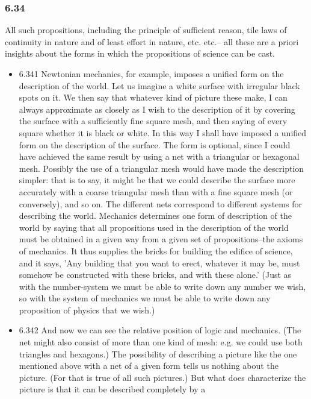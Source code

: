 \documentclass[11pt]{article}
\begin{document}
\subsubsection*{6.34}
\label{sec:org5f01576}
All such propositions, including the principle of sufficient reason,
tile laws of continuity in nature and of least effort in nature, etc. etc.--
all these are a priori insights about the forms in which the propositions
of science can be cast.
\begin{itemize}
\item 6.341
\label{sec:org4d0af76}
Newtonian mechanics, for example, imposes a unified form on the
description of the world. Let us imagine a white surface with irregular
black spots on it. We then say that whatever kind of picture these make, I
can always approximate as closely as I wish to the description of it by
covering the surface with a sufficiently fine square mesh, and then saying
of every square whether it is black or white. In this way I shall have
imposed a unified form on the description of the surface. The form is
optional, since I could have achieved the same result by using a net with a
triangular or hexagonal mesh. Possibly the use of a triangular mesh would
have made the description simpler: that is to say, it might be that we
could describe the surface more accurately with a coarse triangular mesh
than with a fine square mesh (or conversely), and so on. The different nets
correspond to different systems for describing the world. Mechanics
determines one form of description of the world by saying that all
propositions used in the description of the world must be obtained in a
given way from a given set of propositions--the axioms of mechanics. It
thus supplies the bricks for building the edifice of science, and it says,
'Any building that you want to erect, whatever it may be, must somehow be
constructed with these bricks, and with these alone.' (Just as with the
number-system we must be able to write down any number we wish, so with the
system of mechanics we must be able to write down any proposition of
physics that we wish.)
\item 6.342
\label{sec:org6fa9d15}
And now we can see the relative position of logic and mechanics. (The
net might also consist of more than one kind of mesh: e.g. we could use
both triangles and hexagons.) The possibility of describing a picture like
the one mentioned above with a net of a given form tells us nothing about
the picture. (For that is true of all such pictures.) But what does
characterize the picture is that it can be described completely by a

\end{itemize}
\end{document}
